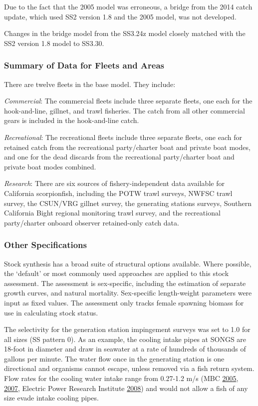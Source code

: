 \documentclass[12pt,]{article}
\begin{document}
Due to the fact that the 2005 model was erroneous, a bridge from the
2014 catch update, which used SS2 version 1.8 and the 2005 model, was
not developed.

Changes in the bridge model from the SS3.24z model closely matched with
the SS2 version 1.8 model to SS3.30.

\subsubsection{Summary of Data for Fleets and
Areas}\label{summary-of-data-for-fleets-and-areas}

There are twelve fleets in the base model. They include:

\emph{Commercial}: The commercial fleets include three separate fleets,
one each for the hook-and-line, gillnet, and trawl fisheries. The catch
from all other commercial gears is included in the hook-and-line catch.

\emph{Recreational}: The recreational fleets include three separate
fleets, one each for retained catch from the recreational party/charter
boat and private boat modes, and one for the dead discards from the
recreational party/charter boat and private boat modes combined.

\emph{Research}: There are six sources of fishery-independent data
available for California scorpionfish, including the POTW trawl surveys,
NWFSC trawl survey, the CSUN/VRG gillnet survey, the generating stations
surveys, Southern California Bight regional monitoring trawl survey, and
the recreational party/charter onboard observer retained-only catch
data.

\subsubsection{Other Specifications}\label{other-specifications}

Stock synthesis has a broad suite of structural options available. Where
possible, the `default' or most commonly used approaches are applied to
this stock assessment. The assessment is sex-specific, including the
estimation of separate growth curves, and natural mortality.
Sex-specific length-weight parameters were input as fixed values. The
assessment only tracks female spawning biomass for use in calculating
stock status.

The selectivity for the generation station impingement surveys was set
to 1.0 for all sizes (SS pattern 0). As an example, the cooling intake
pipes at SONGS are 18-foot in diameter and draw in seawater at a rate of
hundreds of thousands of gallons per minute. The water flow once in the
generating station is one directional and organisms cannot escape,
unless removed via a fish return system. Flow rates for the cooling
water intake range from 0.27-1.2 m/s (MBC
\protect\hyperlink{ref-MBC2005}{2005},
\protect\hyperlink{ref-MBC2007}{2007}, Electric Power Research Institute
\protect\hyperlink{ref-EPRI2008}{2008}) and would not allow a fish of
any size evade intake cooling pipes.
\end{document}
